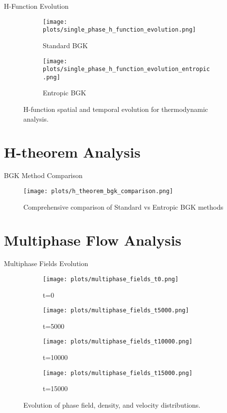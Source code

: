 \documentclass{beamer}
\begin{document}
\begin{frame}{H-Function Evolution}
  \begin{figure}
    \begin{subfigure}[b]{0.48\textwidth}
      \texttt{[image: plots/single\_phase\_h\_function\_evolution.png]}
      \caption{Standard BGK}
    \end{subfigure}
    \hfill
    \begin{subfigure}[b]{0.48\textwidth}
      \texttt{[image: plots/single\_phase\_h\_function\_evolution\_entropic.png]}
      \caption{Entropic BGK}
    \end{subfigure}
    \caption{H-function spatial and temporal evolution for thermodynamic analysis.}
  \end{figure}
\end{frame}

\section{H-theorem Analysis}

\begin{frame}{BGK Method Comparison}
  \begin{figure}
    \texttt{[image: plots/h\_theorem\_bgk\_comparison.png]}
    \caption{Comprehensive comparison of Standard vs Entropic BGK methods}
  \end{figure}
\end{frame}

\section{Multiphase Flow Analysis}

\begin{frame}{Multiphase Fields Evolution}
  \begin{figure}
    \begin{subfigure}[b]{0.48\textwidth}
      \texttt{[image: plots/multiphase\_fields\_t0.png]}
      \caption{t=0}
    \end{subfigure}
    \hfill
    \begin{subfigure}[b]{0.48\textwidth}
      \texttt{[image: plots/multiphase\_fields\_t5000.png]}
      \caption{t=5000}
    \end{subfigure}
    \vfill
    \begin{subfigure}[b]{0.48\textwidth}
      \texttt{[image: plots/multiphase\_fields\_t10000.png]}
      \caption{t=10000}
    \end{subfigure}
    \hfill
    \begin{subfigure}[b]{0.48\textwidth}
      \texttt{[image: plots/multiphase\_fields\_t15000.png]}
      \caption{t=15000}
    \end{subfigure}
    \caption{Evolution of phase field, density, and velocity distributions.}
  \end{figure}
\end{frame}
\end{document}
